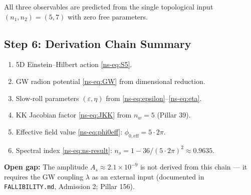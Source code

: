 \documentclass[12pt,a4paper]{article}
\begin{document}
\noindent
All three observables are predicted from the single topological input
$(n_1, n_2) = (5, 7)$ with zero free parameters.

\subsection*{Step 6: Derivation Chain Summary}

\begin{enumerate}
  \item 5D Einstein--Hilbert action \eqref{ns-eq:S5}.
  \item GW radion potential \eqref{ns-eq:GW} from dimensional reduction.
  \item Slow-roll parameters $(\varepsilon, \eta)$ from \eqref{ns-eq:epsilon}--\eqref{ns-eq:eta}.
  \item KK Jacobian factor \eqref{ns-eq:JKK} from $n_w = 5$ (Pillar 39).
  \item Effective field value \eqref{ns-eq:phi0eff}: $\phi_{0,\mathrm{eff}} = 5\cdot 2\pi$.
  \item Spectral index \eqref{ns-eq:ns-result}: $n_s = 1 - 36/(5\cdot 2\pi)^2 \approx 0.9635$.
\end{enumerate}

\noindent
\textbf{Open gap:} The amplitude $A_s \approx 2.1\times10^{-9}$ is not derived
from this chain — it requires the GW coupling $\lambda$ as an external input
(documented in \texttt{FALLIBILITY.md}, Admission 2; Pillar 156).


\end{document}
